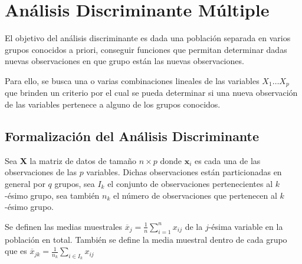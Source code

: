 \newpage
\section{Análisis Discriminante Múltiple}
\noindent El objetivo del análisis discriminante es dada una población separada en varios grupos conocidos a priori, conseguir funciones que permitan determinar dadas nuevas observaciones en que grupo están las nuevas observaciones. 

\noindent Para ello, se busca una o varias combinaciones lineales de las variables $X_1\ldots X_p$ que brinden un criterio por el cual se pueda determinar si una nueva observación de las variables pertenece a alguno de los grupos conocidos. 

\subsection{Formalización del Análisis Discriminante}
 
\noindent Sea \textbf{X} la matriz de datos de tamaño $n \times p$
donde $\textbf{x}_i$ es cada una de las observaciones de las $p$ variables. Dichas observaciones están particionadas en general por $q$ grupos, sea $I_k$ el conjunto de observaciones pertenecientes al $k$-ésimo grupo, sea también $n_k$ el número de observaciones que pertenecen al $k$-ésimo grupo.

\noindent Se definen las medias muestrales $\overline{x}_j=\frac{1}{n}\sum_{i=1}^n x_{ij}$ de la $j$-ésima variable en la población en total. También se define la media muestral dentro de cada grupo que es $\overline{x}_{jk}=\frac{1}{n_k}\sum 
_{i\in I_k} x_{ij}$


